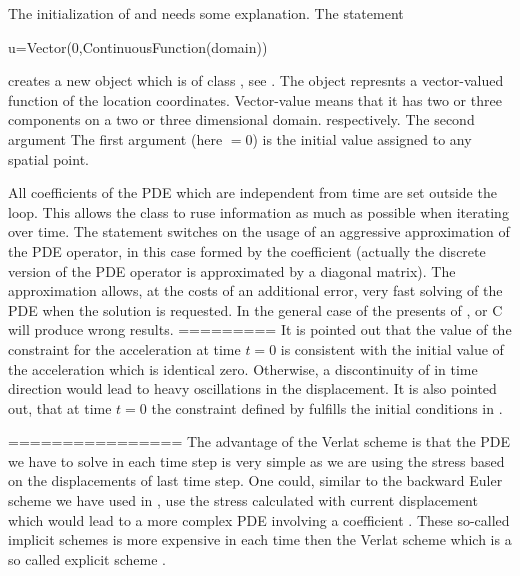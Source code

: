 The initialization of  and  needs some explanation. The statement
\begin{python}
u=Vector(0,ContinuousFunction(domain))
\end{python}
creates a new object which is of class \Data, see . The object represnts a vector-valued
function of the location coordinates. Vector-value means that it has two or three components on a two or three dimensional domain. respectively. The second argument The first argument (here $=0$) is the initial value
assigned to any spatial point. 



All coefficients of the PDE which are independent from time are set outside the  
loop. This allows the \LinearPDE class to ruse information as much as possible 
when iterating over time.  The statement 
switches on the usage of an aggressive approximation of the PDE operator, in this case
formed by the coefficient  (actually the discrete 
version of the PDE operator is approximated by a diagonal matrix). The approximation allows, at the costs of 
an additional error, very fast 
solving of the PDE when the solution is requested. In the general case of the presents of ,  or \var
{C}  will produce wrong results.
=========
It is pointed out that the value of the constraint  for the acceleration  at time $t=0$ is consistent 
with the initial value of the acceleration which is identical zero. Otherwise, a discontinuity of  in time 
direction would lead to heavy oscillations in the displacement. It is also pointed out, that at time $t=0$ the 
constraint defined by  fulfills
the initial conditions in . 


================
The advantage of the Verlat scheme is that the PDE we have to solve in each time step is very 
simple as we are using the stress based on the displacements of last time step. One could, similar to the
backward Euler scheme we have used in , use the stress calculated with current
displacement which would lead to a more complex PDE involving a coefficient . These so-called implicit schemes
  is more expensive in each time then the Verlat scheme which 
is a so called explicit scheme  .     

